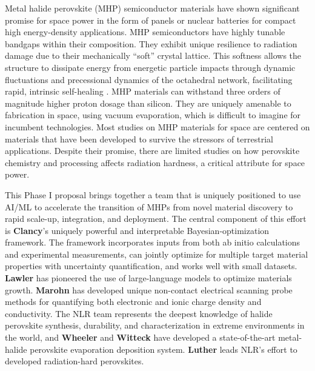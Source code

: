 \documentclass[pgs]{DOE}
\newcommand{\highlight}[1]{{\noindent \bf \color{RawSienna} #1}}
\begin{document}
Metal halide perovskite (MHP) semiconductor materials have shown significant promise for space power in the form of panels or nuclear batteries for compact high energy-density applications.
MHP semiconductors have highly tunable bandgaps within their  composition. %
They exhibit unique resilience to radiation damage due to their mechanically ``soft'' crystal lattice.
This softness allows the structure to dissipate energy from energetic particle impacts through dynamic fluctuations and precessional dynamics of the octahedral network, facilitating rapid, intrinsic self-healing \cite{kirmaniUnravelingRadiationDamage2024, miskinHowSoftMetal}.
MHP materials can withstand three orders of magnitude higher proton dosage than silicon. 
They are uniquely amenable to fabrication in space, using vacuum evaporation, which is difficult to imagine for incumbent technologies.
Most studies on MHP materials for space are centered on materials that have been developed to survive the stressors of terrestrial applications. 
Despite their promise, there are limited studies on how perovskite chemistry and processing affects radiation hardness, a critical attribute for space power.

 

This Phase I proposal brings together a team that is uniquely positioned to use AI/ML to accelerate the transition of MHPs from novel material discovery to rapid scale-up, integration, and deployment.
The central component of this effort is \highlight{Clancy}'s uniquely powerful and interpretable Bayesian-optimization framework.
The framework incorporates inputs from both ab initio calculations and experimental measurements, can jointly optimize for multiple target material properties with uncertainty quantification, and works well with small datasets.
\highlight{Lawler} has pioneered the use of large-language models to optimize materials growth.
\highlight{Marohn} has developed unique non-contact electrical scanning probe methods for quantifying both electronic and ionic charge density and conductivity.
The NLR team represents the deepest knowledge of halide perovskite synthesis, durability, and characterization in extreme environments in the world, and \highlight{Wheeler} and \highlight{Witteck} have developed a state-of-the-art metal-halide perovskite evaporation deposition system.
\highlight{Luther} leads NLR's effort to developed radiation-hard perovskites.
\end{document}
